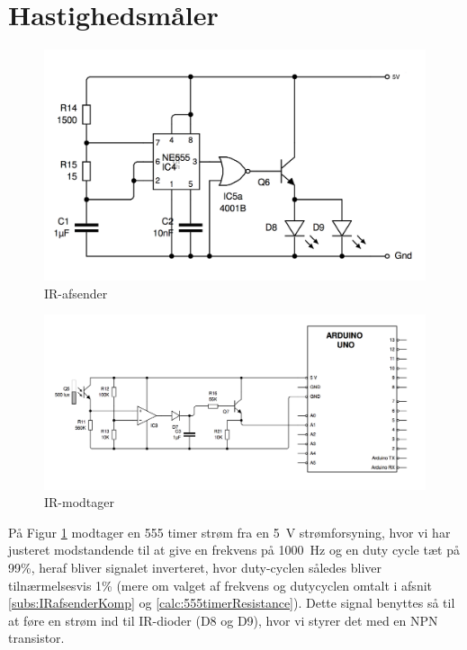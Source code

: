 \section{Hastighedsmåler}
\begin{figure}[H]
	\centering
    \includegraphics[width=13cm]{figures/CIRCUITS/IRafsenderFinal.png}
	\caption{IR-afsender}
	\label{fig:IRafsender}
\end{figure}
\begin{figure}[H]
	\centering
    \includegraphics[width=17cm]{figures/CIRCUITS/IRmodtagerFinal.png}
	\caption{IR-modtager}
	\label{fig:IRmodtager}
\end{figure}



På Figur \ref{fig:IRafsender} modtager en 555 timer strøm fra en \SI{5}{V} strømforsyning, hvor vi har justeret modstandende til at give en frekvens på \SI{1000}{Hz} og en duty cycle tæt på 99\%, heraf bliver signalet inverteret, hvor duty-cyclen således bliver tilnærmelsesvis 1\% (mere om valget af frekvens og dutycyclen omtalt i afsnit \ref{subs:IRafsenderKomp} og \ref{calc:555timerResistance}). Dette signal benyttes så til at føre en strøm ind til IR-dioder (D8 og D9), hvor vi styrer det med en NPN transistor.

